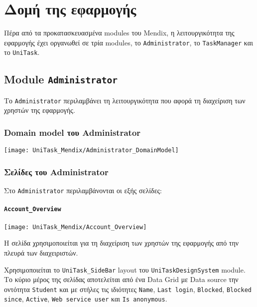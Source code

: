     \section{Δομή της εφαρμογής} \label{sec:unitask_mendix}
        Πέρα από τα προκατασκευασμένα modules του Mendix, η λειτουργικότητα της εφαρμογής έχει οργανωθεί σε τρία modules, το \texttt{Administrator}, το \texttt{TaskManager} και το \texttt{UniTask}.

        \subsection{Module \texttt{Administrator}}
            Το \texttt{Administrator} περιλαμβάνει τη λειτουργικότητα που αφορά τη διαχείριση των χρηστών της εφαρμογής.
            \subsubsection{Domain model του Administrator}
                \begin{center}
                    \texttt{[image: UniTask\_Mendix/Administrator\_DomainModel]}
                \end{center}

            \subsubsection{Σελίδες του Administrator}
                Στο \texttt{Administrator} περιλαμβάνονται οι εξής σελίδες:
                \paragraph{\texttt{Account\_Overview}}
                    \begin{center}
                        \texttt{[image: UniTask\_Mendix/Account\_Overview]}
                    \end{center}

                    Η σελίδα χρησιμοποιείται για τη διαχείριση των χρηστών της εφαρμογής από την πλευρά των διαχειριστών.

                    Χρησιμοποιείται το \texttt{UniTask\_SideBar} layout του \texttt{UniTaskDesignSystem} module. Το κύριο μέρος της σελίδας αποτελείται από ένα Data Grid με Data source την οντότητα \texttt{Student} και με στήλες τις ιδιότητες \texttt{Name}, \texttt{Last login}, \texttt{Blocked}, \texttt{Blocked since}, \texttt{Active}, \texttt{Web service user} και \texttt{Is anonymous}.

